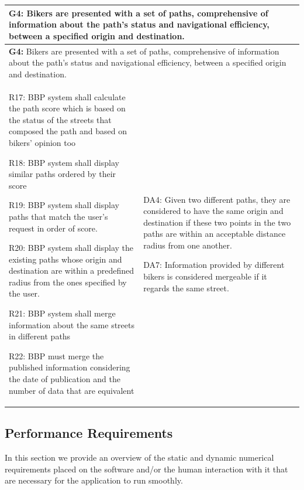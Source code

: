 \documentclass{article}
\begin{document}
\newpage
\begin{longtable}{|p{}|p{}|}
    \hline
    \multicolumn{2}{|p{\dimexpr\textwidth-2\tabcolsep-2\arrayrulewidth}|}{
        \textbf{G4:} Bikers are presented with a set of paths, comprehensive of information about the path’s status and navigational efficiency, between a specified origin and destination.
    } \\
    \hline
    \endfirsthead
    \hline
    \multicolumn{2}{|p{\dimexpr\textwidth-2\tabcolsep-2\arrayrulewidth}|}{
        \textbf{G4:} Bikers are presented with a set of paths, comprehensive of information about the path’s status and navigational efficiency, between a specified origin and destination.
    } \\
    \hline
    \endhead
 
    R17: BBP system shall calculate the path score which is based on the status of the streets that composed the path and based on bikers’ opinion too \par
    R18: BBP system shall display similar paths ordered by their score \par
    R19: BBP system shall display paths that match the user's request in order of score. \par
    R20: BBP system shall display the existing paths whose origin and destination are within a predefined radius from the ones specified by the user. \par
    R21: BBP system shall merge information about the same streets in different paths \par
    R22: BBP must merge the published information considering the date of publication and the number of data that are equivalent
    & 
    DA4: Given two different paths, they are considered to have the same origin and destination if these two points in the two paths are within an acceptable distance radius from one another.   \par
    DA7: Information provided by different bikers is considered mergeable if it regards the same street. \\
    \hline

\end{longtable}

\newpage
\subsection{Performance Requirements}
In this section we provide an overview of the static and dynamic numerical requirements placed on the software and/or the human interaction with it that are necessary for the application to run smoothly.
\end{document}
